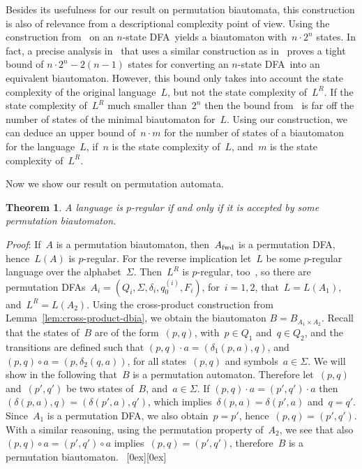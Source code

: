 \documentclass[submission]{eptcs}
\newcommand{\dfa}{\textrm{DFA}}
\newcommand{\fwd}{{\textnormal{fwd}}}
\newcommand*{\qed}{\raisebox{0.5ex}[0ex][0ex]{\framebox[1ex][l]{}}}
\newtheorem{theorem}{Theorem}
\newenvironment{proof}{\par\noindent
  {\rmfamily\itshape\mdseries Proof\/}:\hspace{\labelsep}\ignorespaces}{\mbox{}\nolinebreak\hfill~{\qed}
  \medbreak
}
\begin{document}
Besides its usefulness for our result on permutation biautomata, this
construction is also of relevance from a descriptional complexity
point of view.
Using the construction from~\cite{KlPo12} on an $n$-state \dfa\ yields
a biautomaton with~$n\cdot 2^n$ states.  In fact, a precise analysis
in~\cite{JiKl12} that uses a similar construction as in~\cite{KlPo12}
proves a tight bound of $n\cdot 2^n - 2(n-1)$ states for converting an
$n$-state \dfa\ into an equivalent biautomaton.  However, this bound
only takes into account the state complexity of the original
language~$L$, but not the state complexity of~$L^R$.  If the state
complexity of~$L^R$ much smaller than~$2^n$ then the bound
from~\cite{JiKl12} is far off the number of states of the minimal
biautomaton for~$L$.  Using our construction, we can deduce an upper
bound of~$n\cdot m$ for the number of states of a biautomaton for the
language~$L$, if~$n$ is the state complexity of~$L$, and~$m$ is the
state complexity of~$L^R$.

Now we show our result on permutation automata.

\begin{theorem}
  A language is $p$-regular if and only if it is accepted by some
  permutation biautomaton.
\end{theorem}

\begin{proof}
  If~$A$ is a permutation biautomaton, then~$A_\fwd$ is a permutation
  \dfa, hence~$L(A)$ is $p$-regular.  For the reverse implication
  let~$L$ be some $p$-regular language over the alphabet~$\Sigma$.
  Then~$L^R$ is $p$-regular, too~\cite{Th68a}, so there are
  permutation \dfa s~$A_i=(Q_i,\Sigma,\delta_i,q_0^{(i)},F_i)$,
  for~$i=1,2$, that~$L=L(A_1)$, and~$L^R=L(A_2)$.  Using the
  cross-product construction from Lemma~\ref{lem:cross-product-dbia},
  we obtain the biautomaton $B=B_{A_1\times A_2}$.  Recall that the
  states of~$B$ are of the form~$(p,q)$, with~$p\in Q_1$ and~$q\in
  Q_2$, and the transitions are defined such that $(p,q)\cdot a =
  (\delta_1(p,a),q)$, and $(p,q)\circ a = (p,\delta_2(q,a))$, for all
  states~$(p,q)$ and symbols~$a\in\Sigma$.  We will show in the
  following that~$B$ is a permutation automaton.  Therefore
  let~$(p,q)$ and~$(p',q')$ be two states of~$B$, and~$a\in\Sigma$.
  If $(p,q)\cdot a = (p',q')\cdot a$ then $(\delta(p,a),q) =
  (\delta(p',a),q')$, which implies~$\delta(p,a)=\delta(p',a)$
  and~$q=q'$.  Since~$A_1$ is a permutation \dfa, we also
  obtain~$p=p'$, hence~$(p,q)=(p',q')$.  With a similar reasoning,
  using the permutation property of~$A_2$, we see that also
  $(p,q)\circ a = (p',q')\circ a$ implies~$(p,q)=(p',q')$,
  therefore~$B$ is a permutation biautomaton.
\end{proof}
\end{document}

